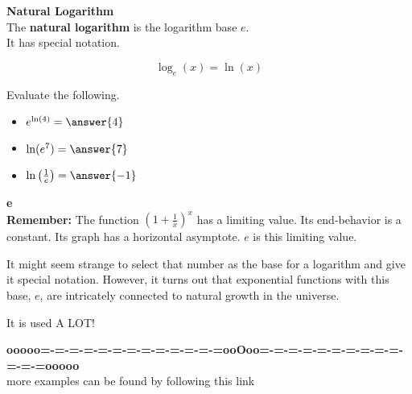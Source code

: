 \documentclass{ximera}
\begin{document}
\begin{definition} \textbf{\textcolor{green!50!black}{Natural Logarithm}}   \\


The \textbf{natural logarithm} is the logarithm base $e$.  \\

It has special notation.

\[
\log_e(x) = \ln(x)
\]

\end{definition}



\begin{question}


Evaluate the following.

\begin{itemize}
\item $e^{\ln(4)} = \answer{4}$ 
\item $\ln(e^7) = \answer{7}$
\item $\ln\left( \frac{1}{e} \right) = \answer{-1}$
\end{itemize}



\end{question}



\begin{remark} \textbf{\textcolor{purple!85!blue}{e}} \\

\textbf{\textcolor{blue!55!black}{Remember:}} The function $\left( 1 + \frac{1}{x}  \right)^{x}$ has a limiting value.  Its end-behavior is a constant.  Its graph has a horizontal asymptote.  $e$ is this limiting value.

It might seem strange to select that number as the base for a logarithm and give it special notation.  However, it turns out that exponential functions with this base, $e$, are intricately connected to natural growth in the universe.

It is used A LOT!
\end{remark}










\begin{center}
\textbf{\textcolor{green!50!black}{ooooo=-=-=-=-=-=-=-=-=-=-=-=-=ooOoo=-=-=-=-=-=-=-=-=-=-=-=-=ooooo}} \\

more examples can be found by following this link\\ 

\end{center}
\end{document}
